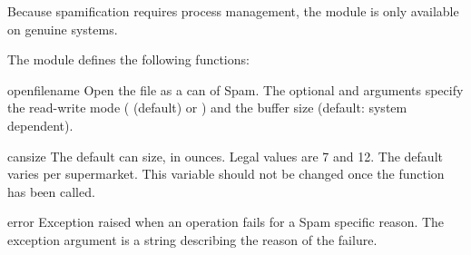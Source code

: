 Because spamification requires \UNIX{} process management, the module
is only available on genuine \UNIX{} systems.



The  module defines the following functions:


\begin{funcdesc}{open}{filename}
Open the file  as a can of Spam.  The optional
 and  arguments specify the read-write mode
( (default) or ) and the buffer size (default:
system dependent).
\end{funcdesc}


\begin{datadesc}{cansize}
The default can size, in ounces.  Legal values are 7 and 12.  The
default varies per supermarket.  This variable should not be changed
once the  function has been called.
\end{datadesc}


\begin{excdesc}{error}
Exception raised when an operation fails for a Spam specific reason.
The exception argument is a string describing the reason of the
failure.
\end{excdesc}

